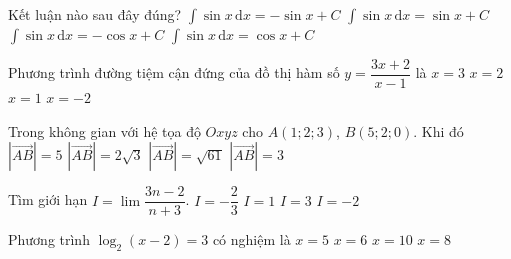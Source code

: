 \begin{ex}%
Kết luận nào sau đây đúng?
\choice
{$\displaystyle\int\limits\sin x\mathrm{\,d}x=-\sin x+C$}
{$\displaystyle\int\limits\sin x\mathrm{\,d}x=\sin x+C$}
{\True $\displaystyle\int\limits\sin x\mathrm{\,d}x=-\cos x+C$}
{$\displaystyle\int\limits\sin x\mathrm{\,d}x=\cos x+C$}
\end{ex}
\begin{ex}%
	Phương trình đường tiệm cận đứng của đồ thị hàm số $y=\dfrac{3x+2}{x-1}$ là
	\choice
	{$x=3$}
	{$x=2$}
	{\True $x=1$}
	{$x=-2$}
\end{ex}
\begin{ex}%
	Trong không gian với hệ tọa độ $Oxyz$ cho $A(1;2;3)$,  $B(5;2;0)$. Khi đó
	\choice
	{\True $\left| \overrightarrow{AB}\right|=5$}
	{$\left| \overrightarrow{AB}\right|=2\sqrt{3}$}
	{$\left| \overrightarrow{AB}\right|=\sqrt{61}$}
	{$\left| \overrightarrow{AB}\right|=3$}
\end{ex}
\begin{ex}%
	Tìm giới hạn $I=\displaystyle \lim\limits \dfrac{3n-2}{n+3}$.
	\choice
	{$I=-\dfrac{2}{3}$}
	{$I=1$}
	{\True $I=3$}
	{$I=-2$}
\end{ex}
\begin{ex}%
	Phương trình $\log_2(x-2)=3$ có nghiệm là
	\choice
	{$x=5$}
	{$x=6$}
	{\True $x=10$}
	{$x=8$}
\end{ex}
